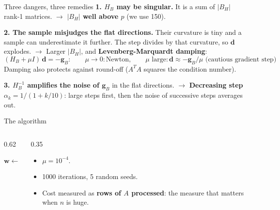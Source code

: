 \documentclass[10pt,aspectratio=169]{beamer}
\newcommand{\hl}[1]{\textcolor{accent}{\textbf{#1}}}
\begin{document}
\begin{frame}{Three dangers, three remedies}
  \textbf{1. $H_B$ may be singular.} It is a sum of $|B_H|$ rank-1 matrices.
  \;$\to$\; \hl{$|B_H|$ well above $p$} (we use 150).
  \vspace{0.6em}

  \textbf{2. The sample misjudges the flat directions.} Their curvature is
  tiny and a sample can underestimate it further. The step divides by that
  curvature, so $\bm{d}$ explodes.
  \;$\to$\; Larger $|B_H|$, and \hl{Levenberg-Marquardt damping}:
  \[
    (H_B + \mu I)\,\bm{d} = -\bm{g}_B: \qquad
    \mu \to 0: \text{Newton}, \qquad
    \mu \text{ large}: \bm{d} \approx -\bm{g}_B/\mu \text{ (cautious gradient step)}
  \]
  Damping also protects against round-off ($A^TA$ squares the condition
  number).
  \vspace{0.6em}

  \textbf{3. $H_B^{-1}$ amplifies the noise of $\bm{g}_B$} in the flat
  directions. \;$\to$\; \hl{Decreasing step}
  $\alpha_k = 1/(1 + k/10)$: large steps first, then the noise of successive
  steps averages out.
\end{frame}

\begin{frame}{The algorithm}
  \begin{columns}[c]
    \begin{column}{0.62\textwidth}
      \footnotesize
      \begin{algorithm}[H]
        \caption{Stochastic Gauss-Newton}
        $\bm{w} \leftarrow \bm{0}$\;
      \end{algorithm}
    \end{column}
    \begin{column}{0.35\textwidth}
      \begin{itemize}
        \item $\mu = 10^{-4}$.
        \item 1000 iterations, 5 random seeds.
        \item Cost measured as \hl{rows of $A$ processed}: the measure that
              matters when $n$ is huge.
      \end{itemize}
    \end{column}
  \end{columns}
\end{frame}
\end{document}
